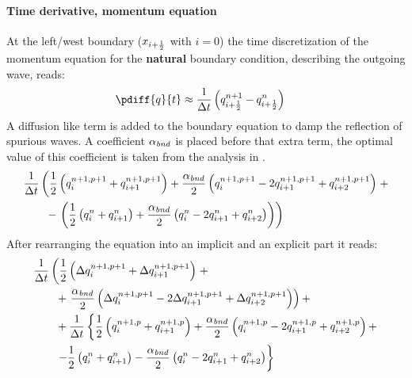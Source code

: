 \paragraph*{Time derivative, momentum equation}
At the left/west boundary ($x_{i+\frac{1}{2}}$ with $i=0$) the time discretization of the momentum equation for the \textbf{natural} boundary condition, describing the outgoing wave, reads:
\begin{align}
    \pdiff{q}{t} & \approx \frac{1}{\Dt} \left(  q^{n+1}_{i+\half} - q^{n}_{i+\half} \right)
\end{align}
A diffusion like term is added to the boundary equation to damp the reflection of spurious waves.
A coefficient $\alpha_{\it bnd}$ is placed before that extra term, the optimal value of this coefficient is taken from the analysis in \citet{transpeq-analysisdiscretizationinsidedomain_boundaries.mw}.
\begin{align}
    & \frac{1}{\Delta t}\left( \frac{1}{2} \left( q^{n+1,p+1}_{i} + q^{n+1,p+1}_{i+1} \right)
    + \frac{\alpha_{\it bnd}}{2} \left( q^{n+1,p+1}_{i} - 2 q^{n+1,p+1}_{i+1} + q^{n+1,p+1}_{i+2}  \right) \right. +
    \nonumber \\*
    & \qquad  - \left. \left(
    \frac{1}{2} \left( q^{n}_{i} + q^{n}_{i+1} \right)
    + \frac{\alpha_{\it bnd}}{2}  \left( q^{n}_{i} - 2 q^{n}_{i+1} + q^{n}_{i+2}  \right) \right)
    \right)
\end{align}
After rearranging the equation into an implicit and an explicit part it reads:
\begin{align}
    & \frac{1}{\Delta t}  \left( \frac{1}{2} \left( \Delta q^{n+1, p+1}_{i} + \Delta q^{n+1, p+1}_{i+1} \right) \right. +
    \nonumber \\*
    & \qquad + \left. \frac{\alpha_{\it bnd}}{2}\left( \Delta q^{n+1,p+1}_{i} - 2 \Delta q^{n+1,p+1}_{i+1} + \Delta q^{n+1,p+1}_{i+2} \right) \right) +
    \nonumber \\
    & \qquad +  \frac{1}{\Delta t} \left\{ \frac{1}{2} \left( q^{n+1, p}_{i} + q^{n+1, p}_{i+1} \right) + \frac{\alpha_{\it bnd}}{2}\left( q^{n+1,p}_{i} - 2 q^{n+1,p}_{i+1}  + q^{n+1,p}_{i+2} \right) + \right.
    \nonumber \\*
    & \qquad
    \left.  - \frac{1}{2} \left( q^{n}_{i} + q^{n}_{i+1} \right) - \frac{\alpha_{\it bnd}}{2} \left( q^{n}_{i} - 2 q^{n}_{i+1} + q^{n}_{i+2}  \right) \right\}
\end{align}
